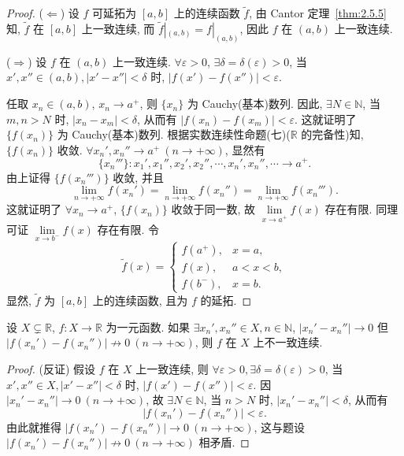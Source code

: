 \begin{proof}
($\Leftarrow$) 设 $f$ 可延拓为 $[a,b]$ 上的连续函数 $\tilde{f}$, 由 Cantor 定理~\ref{thm:2.5.5} 知, $\tilde{f}$ 在 $[a,b]$ 上一致连续, 而 $\tilde{f}|_{(a,b)} = f|_{(a,b)}$, 因此 $f$ 在 $(a,b)$ 上一致连续.

($\Rightarrow$) 设 $f$ 在 $(a,b)$ 上一致连续. $\forall \varepsilon > 0$, $\exists \delta = \delta(\varepsilon) > 0$, 当 $x', x'' \in (a,b), |x' - x''| < \delta$ 时, $|f(x') - f(x'')| < \varepsilon$.

任取 $x_n \in (a,b)$, $x_n \to a^+$, 则 $\{x_n\}$ 为 Cauchy(基本)数列. 因此, $\exists N \in \mathbb{N}$, 当 $m, n > N$ 时, $|x_n - x_m| < \delta$, 从而有 $|f(x_n) - f(x_m)| < \varepsilon$. 这就证明了 $\{f(x_n)\}$ 为 Cauchy(基本)数列. 根据实数连续性命题(七)($\mathbb{R}$ 的完备性)知, $\{f(x_n)\}$ 收敛. $\forall x_n', x_n'' \to a^+\ (n \to +\infty)$, 显然有
\[
\{x_n'''\} \colon x_1', x_1'', x_2', x_2'', \cdots, x_n', x_n'', \cdots \to a^+.
\]
由上证得 $\{f(x_n''')\}$ 收敛, 并且
\[
\lim_{n \to +\infty} f(x_n') = \lim_{n \to +\infty} f(x_n'') = \lim_{n \to +\infty} f(x_n''').
\]
这就证明了 $\forall x_n \to a^+$, $\{f(x_n)\}$ 收敛于同一数, 故 $\lim\limits_{x \to a^+} f(x)$ 存在有限. 同理可证 $\lim\limits_{x \to b^-} f(x)$ 存在有限. 令
\[
\tilde{f}(x) = \begin{cases} f(a^+), & x = a, \\ f(x), & a < x < b, \\ f(b^-), & x = b. \end{cases}
\]
显然, $\tilde{f}$ 为 $[a,b]$ 上的连续函数, 且为 $f$ 的延拓.
\end{proof}

\begin{theorem}\label{thm:2.5.8}
设 $X \subsetneq \mathbb{R}$, $f\colon X \to \mathbb{R}$ 为一元函数. 如果 $\exists x_n', x_n'' \in X, n \in \mathbb{N}$, $|x_n' - x_n''| \to 0$ 但 $|f(x_n') - f(x_n'')| \not\to 0\ (n \to +\infty)$, 则 $f$ 在 $X$ 上不一致连续.
\end{theorem}

\begin{proof}
(反证) 假设 $f$ 在 $X$ 上一致连续, 则 $\forall \varepsilon > 0, \exists \delta = \delta(\varepsilon) > 0$, 当 $x', x'' \in X, |x' - x''| < \delta$ 时, $|f(x') - f(x'')| < \varepsilon$. 因 $|x_n' - x_n''| \to 0\ (n \to +\infty)$, 故 $\exists N \in \mathbb{N}$, 当 $n > N$ 时, $|x_n' - x_n''| < \delta$, 从而有
\[
|f(x_n') - f(x_n'')| < \varepsilon.
\]
由此就推得 $|f(x_n') - f(x_n'')| \to 0\ (n \to +\infty)$, 这与题设 $|f(x_n') - f(x_n'')| \not\to 0\ (n \to +\infty)$ 相矛盾.
\end{proof}

